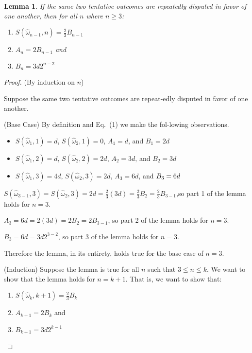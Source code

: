 \documentclass[12pt,floatfix,reprint,nofootinbib,amsmath,amssymb,epsfig,pre,floats,letterpaper,groupedaffiliation]{revtex4-1}
\newtheorem{lemma}[theorem]{Lemma}
\theoremstyle{definition}
\theoremstyle{definition}
\begin{document}
\begin{lemma}
If the same two tentative outcomes are repeatedly disputed in favor of one another, then for all $n$ where $n \geq 3$:
\begin{enumerate}
\item $S(\hat{\omega}_{n-1}, n) = \frac{2}{3} B_{n-1}$
\item $A_n = 2 B_{n-1}$ and
\item $B_n = 3d 2^{n-2}$
\end{enumerate}
\end{lemma}

\begin{proof}
(By induction on $n$)

Suppose the same two tentative outcomes are repeat-\linebreak edly disputed in favor of one another.

(Base Case) By definition and Eq.~(1) we make the fol-\linebreak lowing observations.
\begin{itemize}
\item $S(\hat{\omega}_1, 1) = d$, $S(\hat{\omega}_2, 1) = 0$, $A_1 = d$, and $B_1 = 2d$
\item $S(\hat{\omega}_1, 2) = d$, $S(\hat{\omega}_2, 2) = 2d$, $A_2 = 3d$, and $B_2 = 3d$
\item $S(\hat{\omega}_1, 3) = 4d$, $S(\hat{\omega}_2, 3) = 2d$, $A_3 = 6d$, and $B_3 =\linebreak 6d$
\end{itemize}
$S(\hat{\omega}_{3-1}, 3) = S(\hat{\omega}_2, 3) = 2d = \frac{2}{3}(3d) = \frac{2}{3} B_2 = \frac{2}{3} B_{3-1}$,\linebreak so part 1 of the lemma holds for $n = 3$.

$A_3 = 6d = 2(3d) = 2 B_2 = 2 B_{3-1}$, so part 2 of the lemma holds for $n = 3$.

$B_3 = 6d = 3d 2^{3-2}$, so part 3 of the lemma holds for $n = 3$.

Therefore the lemma, in its entirety, holds true for the base case of $n = 3$.

(Induction) Suppose the lemma is true for all $n$ such that $3 \leq n \leq k$. We want to show that the lemma holds for $n = k+1$. That is, we want to show that:
\begin{enumerate}[label=(\alph*)]
\item $S(\hat{\omega}_k, k+1) = \frac{2}{3} B_k$
\item $A_{k+1} = 2 B_k$ and
\item $B_{k+1} = 3d 2^{k-1}$
\end{enumerate}


\end{proof}
\end{document}
